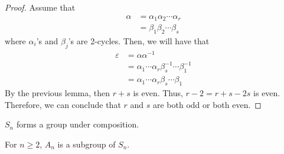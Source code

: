 \begin{proof}
    Assume that 
    \[
    \begin{aligned}
        \alpha &= \alpha_1 \alpha_2 \cdots \alpha_r \\
               &= \beta_1 \beta_2 \cdots \beta_s
    \end{aligned}
    \]
    where \(\alpha_i\)'s and \(\beta_j\)'s are 2-cycles. Then, we will have that
    \[
    \begin{aligned}
        \varepsilon &= \alpha \alpha^{-1} \\
                    &= \alpha_1 \cdots \alpha_r \beta_s^{-1} \cdots \beta_1^{-1} \\
                    &= \alpha_1 \cdots \alpha_r \beta_s \cdots \beta_1
    \end{aligned}
    \]
    By the previous lemma, then \(r+s\) is even. Thus, \(r-2 = r+s - 2s\) is even. Therefore, we can conclude that \(r\) and \(s\) are both odd or both even.
\end{proof}

\begin{theorem}
    \(S_n\) forms a group under composition.
\end{theorem}


\begin{theorem}
    For \(n \geq 2\), \(A_n\) is a subgroup of \(S_n\).
\end{theorem}

